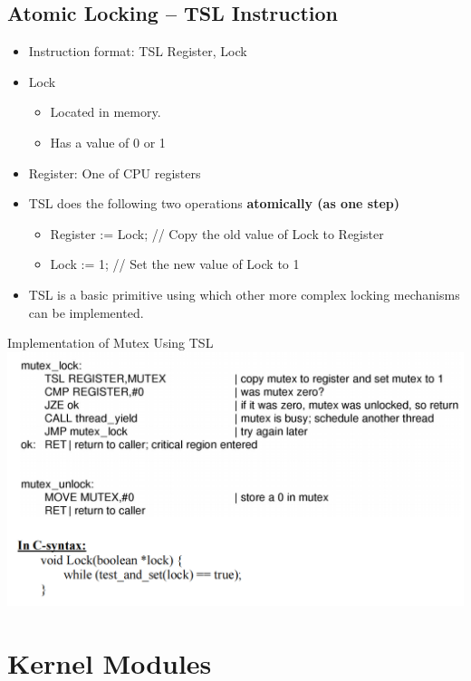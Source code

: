 \documentclass[12pt]{article}
\begin{document}
\subsection{Atomic Locking – TSL Instruction}
\begin{itemize}
    \item Instruction format: TSL Register, Lock
    \item Lock \begin{itemize}
        \item Located in memory. 
        \item Has a value of 0 or 1
    \end{itemize}
    \item Register: One of CPU registers
    \item TSL does the following two operations {\bfseries atomically (as one step)} \begin{itemize}
        \item Register := Lock; // Copy the old value of Lock to Register
        \item Lock := 1; // Set the new value of Lock to 1
    \end{itemize}
    \item TSL is a basic primitive using which other more complex locking mechanisms can be implemented.
\end{itemize}
Implementation of Mutex Using TSL
\newline
\includegraphics[width=\textwidth]{TSLImplementation.png}

\section{Kernel Modules}
\end{document}
